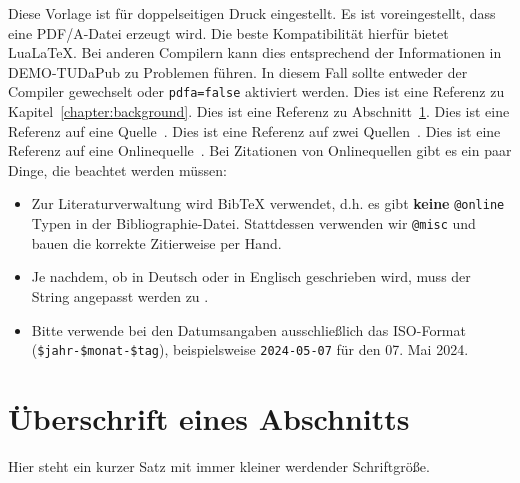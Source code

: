 Diese Vorlage ist für doppelseitigen Druck eingestellt.
Es ist voreingestellt, dass eine PDF/A-Datei erzeugt wird.
Die beste Kompatibilität hierfür bietet Lua\LaTeX.
Bei anderen Compilern kann dies entsprechend der Informationen in DEMO-TUDaPub zu Problemen führen.
In diesem Fall sollte entweder der Compiler gewechselt oder \texttt{pdfa=false} aktiviert werden.
Dies ist eine Referenz zu Kapitel~\ref{chapter:background}.
Dies ist eine Referenz zu Abschnitt~\ref{sect:dummy-section}.
Dies ist eine Referenz auf eine Quelle~\cite{Luthmann2017}.
Dies ist eine Referenz auf zwei Quellen~\cite{Luthmann2019,Ruland2018}.
Dies ist eine Referenz auf eine Onlinequelle~\cite{parallel-computing}.
Bei Zitationen von Onlinequellen gibt es ein paar Dinge, die beachtet werden müssen:
\begin{itemize}
	\item Zur Literaturverwaltung wird BibTeX verwendet, d.h. es gibt \textbf{keine} \texttt{@online} Typen in der Bibliographie-Datei. Stattdessen verwenden wir \texttt{@misc} und bauen die korrekte Zitierweise per Hand.
	\item Je nachdem, ob in Deutsch oder in Englisch geschrieben wird, muss der String  angepasst werden zu .
	\item Bitte verwende bei den Datumsangaben ausschließlich das ISO-Format (\texttt{\$jahr-\$monat-\$tag}), beispielsweise \texttt{2024-05-07} für den 07. Mai 2024.
\end{itemize}



\section{Überschrift eines Abschnitts}\label{sect:dummy-section}


{\Huge Hier} {\huge steht} {\LARGE ein} {\Large kurzer} {\large Satz} {\normalsize mit} {\small immer} {\footnotesize kleiner} {\scriptsize werdender} {\tiny Schriftgröße}.